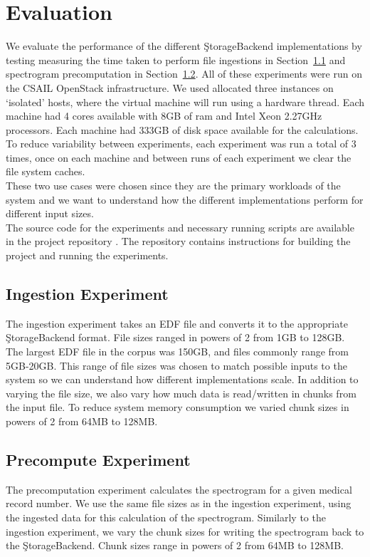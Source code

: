 \section{Evaluation}\label{storage-ch:evaluation}

We evaluate the performance of the different \c{StorageBackend} implementations
by testing measuring the time taken to perform file ingestions in
Section~\ref{storage-ch:ingestion-exp} and spectrogram precomputation in
Section~\ref{storage-ch:precompute-exp}. All of these experiments were run on
the CSAIL OpenStack infrastructure. We used allocated three instances on
`isolated' hosts, where the virtual machine will run using a hardware thread.
Each machine had 4 cores available with 8GB of ram and Intel Xeon 2.27GHz
processors. Each machine had 333GB of disk space available for the
calculations. To reduce variability between experiments, each experiment was
run a total of 3 times, once on each machine and between runs of each
experiment we clear the file system caches.\\

These two use cases were chosen since they are the primary workloads of the
system and we want to understand how the different implementations perform for
different input sizes.\\

The source code for the experiments and necessary running scripts are available
in the project repository \cite{eeg-toolkit}. The repository contains
instructions for building the project and running the experiments.

\subsection{Ingestion Experiment}\label{storage-ch:ingestion-exp}
The ingestion experiment takes an EDF file and converts it to the appropriate
\c{StorageBackend} format. File sizes ranged in powers of 2 from 1GB to 128GB.
The largest EDF file in the corpus was 150GB, and files commonly range from
5GB-20GB. This range of file sizes was chosen to match possible inputs to the
system so we can understand how different implementations scale. In addition to
varying the file size, we also vary how much data is read/written in chunks
from the input file. To reduce system memory consumption we varied chunk sizes
in powers of 2 from 64MB to 128MB.

\subsection{Precompute Experiment}\label{storage-ch:precompute-exp}
The precomputation experiment calculates the spectrogram for a given medical
record number. We use the same file sizes as in the ingestion experiment, using
the ingested data for this calculation of the spectrogram. Similarly to the
ingestion experiment, we vary the chunk sizes for writing the spectrogram back
to the \c{StorageBackend}. Chunk sizes range in powers of 2 from 64MB to 128MB.
